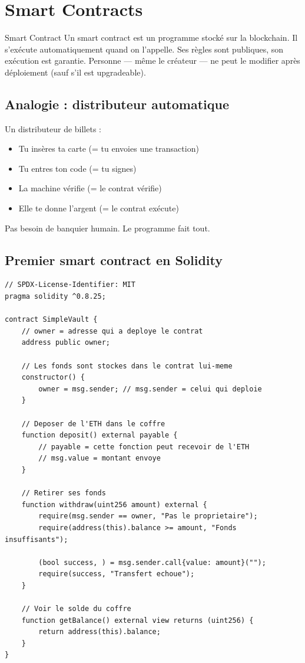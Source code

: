 \documentclass[12pt, a4paper]{article}
\begin{document}
\section{Smart Contracts}

\begin{definition}{Smart Contract}
Un smart contract est un programme stocké sur la blockchain. Il s'exécute automatiquement
quand on l'appelle. Ses règles sont publiques, son exécution est garantie. Personne
--- même le créateur --- ne peut le modifier après déploiement (sauf s'il est upgradeable).
\end{definition}

\subsection{Analogie : distributeur automatique}

Un distributeur de billets :
\begin{itemize}
  \item Tu insères ta carte (= tu envoies une transaction)
  \item Tu entres ton code (= tu signes)
  \item La machine vérifie (= le contrat vérifie)
  \item Elle te donne l'argent (= le contrat exécute)
\end{itemize}
Pas besoin de banquier humain. Le programme fait tout.

\subsection{Premier smart contract en Solidity}

\begin{lstlisting}[style=solidity, caption={Coffre-fort simple --- Vault.sol}]
// SPDX-License-Identifier: MIT
pragma solidity ^0.8.25;

contract SimpleVault {
    // owner = adresse qui a deploye le contrat
    address public owner;

    // Les fonds sont stockes dans le contrat lui-meme
    constructor() {
        owner = msg.sender; // msg.sender = celui qui deploie
    }

    // Deposer de l'ETH dans le coffre
    function deposit() external payable {
        // payable = cette fonction peut recevoir de l'ETH
        // msg.value = montant envoye
    }

    // Retirer ses fonds
    function withdraw(uint256 amount) external {
        require(msg.sender == owner, "Pas le proprietaire");
        require(address(this).balance >= amount, "Fonds insuffisants");

        (bool success, ) = msg.sender.call{value: amount}("");
        require(success, "Transfert echoue");
    }

    // Voir le solde du coffre
    function getBalance() external view returns (uint256) {
        return address(this).balance;
    }
}
\end{lstlisting}
\end{document}
